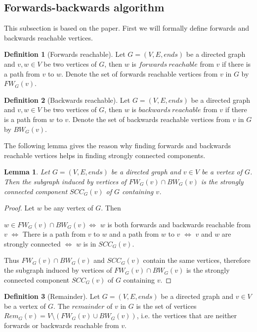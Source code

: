 \documentclass{report}
\theoremstyle{plain}
\newtheorem{lemma}{Lemma}
\theoremstyle{definition}
\newtheorem{definition}{Definition}
\theoremstyle{remark}
\numberwithin{definition}{chapter}
\numberwithin{example}{chapter}
\numberwithin{figure}{chapter}
\numberwithin{theorem}{chapter}
\numberwithin{lemma}{chapter}
\begin{document}
\subsection{Forwards-backwards algorithm}

This subsection is based on the paper\cite{fleischer2000identifying}. First we will formally define forwards and backwards reachable vertices. 

\begin{definition}[Forwards reachable]
Let $G=(V, E, ends)$ be a directed graph and $v,w \in V$ be two vertices of $G$, then $w$ is $forwards \ reachable$ from $v$ if there is a path from $v$ to $w$. Denote the set of forwards reachable vertices from $v$ in $G$ by $FW_G(v)$.
\end{definition}

\begin{definition}[Backwards reachable]
Let $G=(V, E, ends)$ be a directed graph and $v,w \in V$ be two vertices of $G$, then $w$ is $backwards \ reachable$ from $v$ if there is a path from $w$ to $v$. Denote the set of backwards reachable vertices from $v$ in $G$ by $BW_G(v)$.
\end{definition}

The following lemma gives the reason why finding forwards and backwards reachable vertices helps in finding strongly connected components.

\begin{lemma}
Let $G=(V, E, ends)$ be a directed graph and $v \in V$ be a vertex of $G$. Then the subgraph induced by vertices of $FW_G(v) \cap BW_G(v)$ is the strongly connected component $SCC_G(v)$ of $G$ containing $v$.
\label{fw_bw_l1}
\end{lemma}

\begin{proof}
Let $w$ be any vertex of $G$. Then

$w \in FW_G(v) \cap BW_G(v) \Leftrightarrow$
$w$ is both forwards and backwards reachable from $v$ $\Leftrightarrow$
There is a path from $v$ to $w$ and a path from $w$ to $v$ $\Leftrightarrow$
$v$ and $w$ are strongly connected $\Leftrightarrow$
$w$ is in  $SCC_G(v)$.

Thus $FW_G(v) \cap BW_G(v)$ and $SCC_G(v)$ contain the same vertices, therefore the subgraph induced by vertices of $FW_G(v) \cap BW_G(v)$ is the strongly connected component $SCC_G(v)$ of $G$ containing $v$. 
\end{proof}

\begin{definition}[Remainder]
Let $G=(V, E, ends)$ be a directed graph and $v \in V$ be a vertex of $G$. The $remainder$ of $v$ in $G$ is the set of vertices $Rem_G(v)=V \setminus (FW_G(v) \cup BW_G(v))$, i.e. the vertices that are neither forwards or backwards reachable from $v$.
\end{definition}
\end{document}

